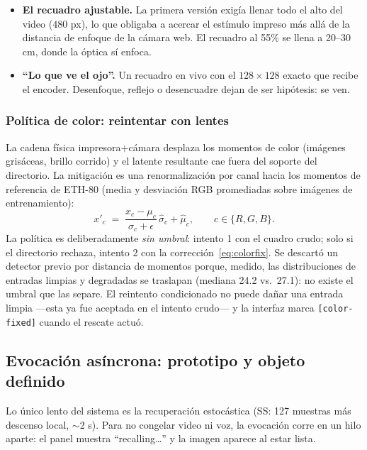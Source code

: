 \begin{itemize}
    \item \textbf{El recuadro ajustable.} La primera versión exigía llenar todo el
    alto del video ($480$ px), lo que obligaba a acercar el estímulo impreso más allá
    de la distancia de enfoque de la cámara web. El recuadro al 55\% se llena a
    20--30 cm, donde la óptica sí enfoca.
    \item \textbf{``Lo que ve el ojo''.} Un recuadro en vivo con el $128\times128$
    exacto que recibe el encoder. Desenfoque, reflejo o desencuadre dejan de ser
    hipótesis: se ven.
\end{itemize}

\subsubsection*{Política de color: reintentar con lentes}

La cadena física impresora$+$cámara desplaza los momentos de color (imágenes grisáceas,
brillo corrido) y el latente resultante cae fuera del soporte del directorio.
La mitigación es una renormalización por canal hacia los momentos de referencia de
ETH-80 (media y desviación RGB promediadas sobre imágenes de entrenamiento):
\begin{equation}
    x'_c \;=\; \frac{x_c - \mu_c}{\sigma_c + \epsilon}\,\hat{\sigma}_c + \hat{\mu}_c,
    \qquad c \in \{R, G, B\}.
    \label{eq:colorfix}
\end{equation}
La política es deliberadamente \emph{sin umbral}: intento 1 con el cuadro crudo; solo
si el directorio rechaza, intento 2 con la corrección~\eqref{eq:colorfix}.
Se descartó un detector previo por distancia de momentos porque, medido, las
distribuciones de entradas limpias y degradadas se traslapan (mediana 24.2 vs.\ 27.1):
no existe el umbral que las separe.
El reintento condicionado no puede dañar una entrada limpia ---esta ya fue aceptada en
el intento crudo--- y la interfaz marca \texttt{[color-fixed]} cuando el rescate actuó.

\subsection{Evocación asíncrona: prototipo y objeto definido}
\label{sec:arq_pista}

Lo único lento del sistema es la recuperación estocástica (SS: 127 muestras más
descenso local, $\sim$2 s).
Para no congelar video ni voz, la evocación corre en un hilo aparte: el panel muestra
``recalling\ldots'' y la imagen aparece al estar lista.

